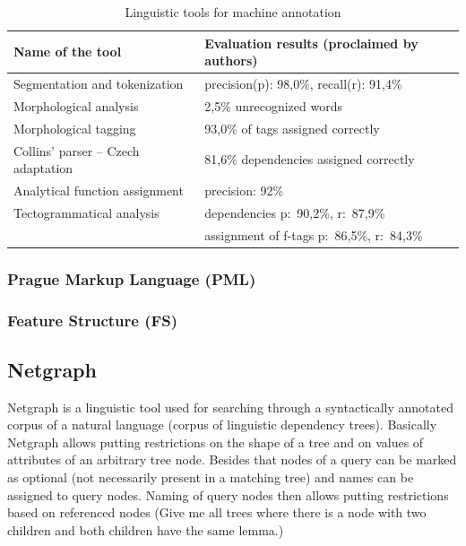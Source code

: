 \begin{table}
\centering
	\begin{tabular}{l|l}
		Name of the tool & Evaluation results (proclaimed by authors) \\[4pt]
		\hline
	Segmentation and tokenization & precision(p): 98,0\%, recall(r): 91,4\% \\[4pt]
	Morphological analysis & 2,5\% unrecognized words\\
	Morphological tagging & 93,0\% of tags assigned correctly \\[4pt]
	Collins' parser -- Czech adaptation & 81,6\% dependencies assigned correctly\\
	Analytical function assignment & precision: 92\% \\[4pt]
	Tectogrammatical analysis & dependencies p:~90,2\%, r:~87,9\%\\
	& assignment of f-tags p:~86,5\%, r:~84,3\%\\
	\end{tabular}
\caption{Linguistic tools for machine annotation}
\label{tab:ling_tools}
\end{table}



\subsubsection{Prague Markup Language (PML)}
\subsubsection{Feature Structure (FS)}


\subsection{Netgraph} \label{sec:ch30_netgraph}

Netgraph \cite{biblio:MiNetgraphA2006} is a linguistic tool used for searching through a syntactically annotated corpus of a natural language (corpus of linguistic dependency trees). Basically Netgraph allows putting restrictions on the shape of a tree and on values of attributes of an arbitrary tree node. Besides that nodes of a query can be marked as optional (not necessarily present in a matching tree) and names can be assigned to query nodes. Naming of query nodes then allows putting restrictions based on referenced nodes (Give me all trees where there is a node with two children and both children have the same lemma.)

